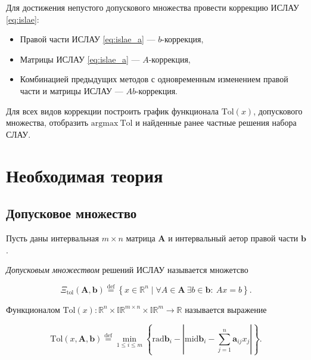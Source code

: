 \documentclass{article}
\begin{document}
  Для достижения непустого допускового множества провести коррекцию ИСЛАУ
  \ref{eq:islae}:

  \begin{itemize}
    \item Правой части ИСЛАУ \ref{eq:islae_a} --- \( b \)-коррекция,
    \item Матрицы ИСЛАУ \ref{eq:islae_a} --- \( A \)-коррекция,
    \item Комбинацией предыдущих методов с одновременным изменением
      правой части и матрицы ИСЛАУ — \( Ab \)-коррекция.
  \end{itemize}

  Для всех видов коррекции построить график функционала
  \( \text{Tol} (x) \), допускового множества, отобразить
  \( \text{argmax} \ \text{Tol} \) и найденные ранее частные решения набора
  СЛАУ.

  \section{Необходимая теория}

  \subsection{Допусковое множество}

  Пусть даны интервальная \( m \times n \) матрица \( \mathbf{A} \) и
  интервальный аетор правой части \( \mathbf{b} \).

  \vspace{\baselineskip}

  \emph{Допусковым множеством} решений ИСЛАУ называется множетсво

  \begin{equation} \label{eq:tol_set_of_solutions}
    \Xi_{\text{tol}} (\mathbf{A}, \mathbf{b}) \stackrel{\text{def}}{=}
      \left \{ x \in \mathbb{R}^n \mid \forall A \in \mathbf{A} \ \exists b \in \mathbf{b}: \ Ax = b \right \}.
  \end{equation}

  \vspace{\baselineskip}

  Функционалом \( \text{Tol} (x): \mathbb{R}^n \times \mathbb{IR}^{m \times n} \times \mathbb{IR}^m \to \mathbb{R} \)
  называется выражение

  \begin{equation} \label{eq:tol}
    \text{Tol} (x, \mathbf{A}, \mathbf{b}) \stackrel{\text{def}}{=}
      \min_{1 \leq i \leq m} \left \{ \text{rad} \mathbf{b}_i - \left | \text{mid} \mathbf{b}_i - \sum_{j=1}^n \mathbf{a}_{ij} x_j \right | \right \}.
  \end{equation}
\end{document}
